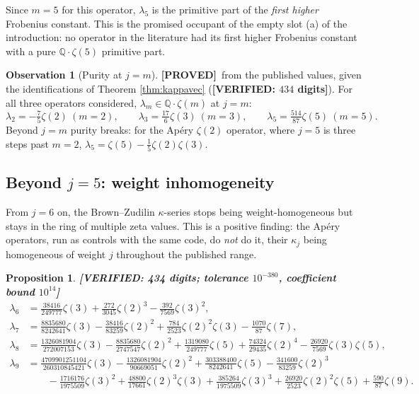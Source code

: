 \documentclass[11pt,reqno]{amsart}
\theoremstyle{plain}
\newtheorem{proposition}[theorem]{Proposition}
\theoremstyle{definition}
\newtheorem{observation}[theorem]{Observation}
\theoremstyle{remark}
\newcommand{\PROVED}{{\normalfont\sffamily\bfseries[PROVED]}}
\newcommand{\VER}[1]{{\normalfont\sffamily\bfseries[VERIFIED: #1]}}
\newcommand{\QQ}{\mathbb{Q}}
\begin{document}
Since $m=5$ for this operator, $\lambda_5$ is the primitive part of the \emph{first higher}
Frobenius constant. This is the promised occupant of the empty slot (a) of the introduction: no
operator in the literature had its first higher Frobenius constant with a pure
$\QQ\cdot\zeta(5)$ primitive part.

\begin{observation}[Purity at $j=m$]\label{obs:purityatm}
\PROVED\ from the published values, given the identifications of Theorem \ref{thm:kappavec}
(\VER{$434$ digits}).
For all three operators considered, $\lambda_m\in\QQ\cdot\zeta(m)$ at $j=m$:
\[
  \lambda_2=-\tfrac{7}{5}\zeta(2)\ (m=2),\qquad
  \lambda_3=\tfrac{17}{6}\zeta(3)\ (m=3),\qquad
  \lambda_5=\tfrac{514}{87}\zeta(5)\ (m=5).
\]
Beyond $j=m$ purity breaks: for the Ap\'ery $\zeta(2)$ operator, where $j=5$ is three steps past
$m=2$, $\lambda_5=\zeta(5)-\tfrac15\zeta(2)\zeta(3)$.
\end{observation}

\subsection{Beyond \texorpdfstring{$j=5$}{j=5}: weight inhomogeneity}\label{sec:inhomog}
From $j=6$ on, the Brown--Zudilin $\kappa$-series stops being weight-homogeneous but stays in the
ring of multiple zeta values. This is a positive finding: the Ap\'ery operators, run as controls
with the same code, do \emph{not} do it, their $\kappa_j$ being homogeneous of weight $j$
throughout the published range.

\begin{proposition}\label{prop:lambdahigh}
\VER{434 digits; tolerance $10^{-380}$, coefficient bound $10^{14}$}
\begin{align*}
  \lambda_6 &= \tfrac{38416}{249777}\zeta(3)+\tfrac{272}{3045}\zeta(2)^3
               -\tfrac{392}{7569}\zeta(3)^2,\\
  \lambda_7 &= \tfrac{8835680}{8242641}\zeta(3)-\tfrac{38416}{83259}\zeta(2)^2
               +\tfrac{784}{2523}\zeta(2)^2\zeta(3)-\tfrac{1070}{87}\zeta(7),\\
  \lambda_8 &= \tfrac{1326081904}{272007153}\zeta(3)-\tfrac{8835680}{2747547}\zeta(2)^2
               +\tfrac{1319080}{249777}\zeta(5)+\tfrac{74324}{29435}\zeta(2)^4
               -\tfrac{26920}{7569}\zeta(3)\zeta(5),\\
  \lambda_9 &= \tfrac{4709901251104}{260310845421}\zeta(3)
               -\tfrac{1326081904}{90669051}\zeta(2)^2
               +\tfrac{303388400}{8242641}\zeta(5)-\tfrac{341600}{83259}\zeta(2)^3\\
            &\qquad -\tfrac{1716176}{1975509}\zeta(3)^2
               +\tfrac{48800}{17661}\zeta(2)^3\zeta(3)
               +\tfrac{385264}{1975509}\zeta(3)^3+\tfrac{26920}{2523}\zeta(2)^2\zeta(5)
               +\tfrac{590}{87}\zeta(9).
\end{align*}
\end{proposition}
\end{document}
